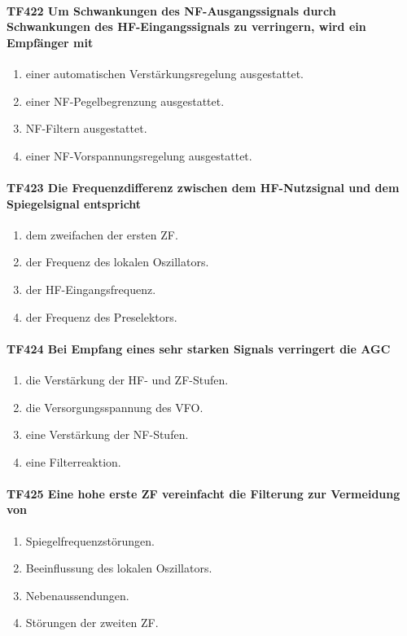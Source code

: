 \documentclass[8pt]{article}
\begin{document}
\paragraph*{TF422 Um Schwankungen des NF-Ausgangssignals durch Schwankungen des HF-Eingangssignals zu verringern, wird ein Empfänger mit}
\begin{enumerate}[nolistsep,label=\Alph*]
\item einer automatischen Verstärkungsregelung ausgestattet.
\item einer NF-Pegelbegrenzung ausgestattet.
\item NF-Filtern ausgestattet.
\item einer NF-Vorspannungsregelung ausgestattet. 
\end{enumerate}

\paragraph*{TF423 Die Frequenzdifferenz zwischen dem HF-Nutzsignal und dem Spiegelsignal entspricht}
\begin{enumerate}[nolistsep,label=\Alph*]
\item dem zweifachen der ersten ZF.
\item der Frequenz des lokalen Oszillators.
\item der HF-Eingangsfrequenz.
\item der Frequenz des Preselektors.
\end{enumerate}

\paragraph*{TF424 Bei Empfang eines sehr starken Signals verringert die AGC}
\begin{enumerate}[nolistsep,label=\Alph*]
\item die Verstärkung der HF- und ZF-Stufen.
\item die Versorgungsspannung des VFO.
\item eine Verstärkung der NF-Stufen.
\item eine Filterreaktion.
\end{enumerate}

\paragraph*{TF425 Eine hohe erste ZF vereinfacht die Filterung zur Vermeidung von}
\begin{enumerate}[nolistsep,label=\Alph*]
\item Spiegelfrequenzstörungen.
\item Beeinflussung des lokalen Oszillators.
\item Nebenaussendungen.
\item Störungen der zweiten ZF.
\end{enumerate}
\end{document}
